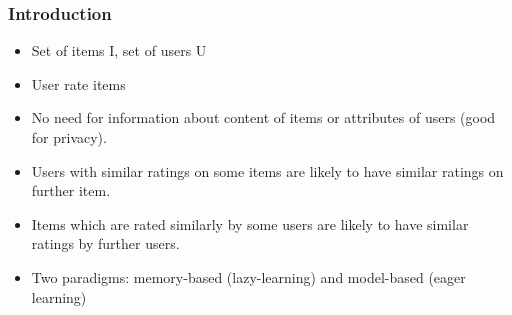 \documentclass[../notes.tex]{subfiles}
\begin{document}
\subsubsection{Introduction}
\begin{itemize}
  \item Set of items I, set of users U
  \item User rate items
  \item No need for information about content of items or attributes of users (good for privacy).
  \item Users with similar ratings on some items are likely to have similar ratings on further item.
  \item Items which are rated similarly by some users are likely to have similar ratings by further users.
  \item Two paradigms: memory-based (lazy-learning) and model-based (eager learning)
\end{itemize}
\end{document}
